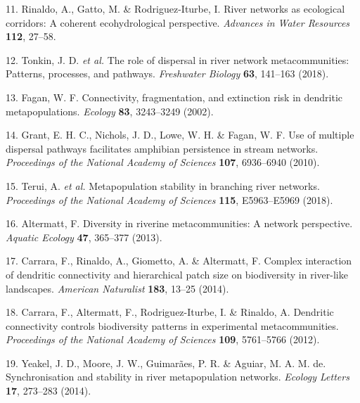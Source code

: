 \documentclass[
]{article}
\newenvironment{cslreferences}%
  {}%
  {\par}
\begin{document}
\begin{cslreferences}
\leavevmode\hypertarget{ref-rinaldoRiverNetworksEcological2018}{}%
11. Rinaldo, A., Gatto, M. \& Rodriguez-Iturbe, I. River networks as
ecological corridors: A coherent ecohydrological perspective.
\emph{Advances in Water Resources} \textbf{112}, 27--58.

\leavevmode\hypertarget{ref-tonkinRoleDispersalRiver2018}{}%
12. Tonkin, J. D. \emph{et al.} The role of dispersal in river network
metacommunities: Patterns, processes, and pathways. \emph{Freshwater
Biology} \textbf{63}, 141--163 (2018).

\leavevmode\hypertarget{ref-faganConnectivityFragmentationExtinction2002}{}%
13. Fagan, W. F. Connectivity, fragmentation, and extinction risk in
dendritic metapopulations. \emph{Ecology} \textbf{83}, 3243--3249
(2002).

\leavevmode\hypertarget{ref-grantUseMultipleDispersal2010}{}%
14. Grant, E. H. C., Nichols, J. D., Lowe, W. H. \& Fagan, W. F. Use of
multiple dispersal pathways facilitates amphibian persistence in stream
networks. \emph{Proceedings of the National Academy of Sciences}
\textbf{107}, 6936--6940 (2010).

\leavevmode\hypertarget{ref-teruiMetapopulationStabilityBranching2018}{}%
15. Terui, A. \emph{et al.} Metapopulation stability in branching river
networks. \emph{Proceedings of the National Academy of Sciences}
\textbf{115}, E5963--E5969 (2018).

\leavevmode\hypertarget{ref-altermattDiversityRiverineMetacommunities2013}{}%
16. Altermatt, F. Diversity in riverine metacommunities: A network
perspective. \emph{Aquatic Ecology} \textbf{47}, 365--377 (2013).

\leavevmode\hypertarget{ref-carraraComplexInteractionDendritic2014}{}%
17. Carrara, F., Rinaldo, A., Giometto, A. \& Altermatt, F. Complex
interaction of dendritic connectivity and hierarchical patch size on
biodiversity in river-like landscapes. \emph{American Naturalist}
\textbf{183}, 13--25 (2014).

\leavevmode\hypertarget{ref-carraraDendriticConnectivityControls2012}{}%
18. Carrara, F., Altermatt, F., Rodriguez-Iturbe, I. \& Rinaldo, A.
Dendritic connectivity controls biodiversity patterns in experimental
metacommunities. \emph{Proceedings of the National Academy of Sciences}
\textbf{109}, 5761--5766 (2012).

\leavevmode\hypertarget{ref-yeakelSynchronisationStabilityRiver2014a}{}%
19. Yeakel, J. D., Moore, J. W., Guimarães, P. R. \& Aguiar, M. A. M.
de. Synchronisation and stability in river metapopulation networks.
\emph{Ecology Letters} \textbf{17}, 273--283 (2014).


\end{cslreferences}
\end{document}
